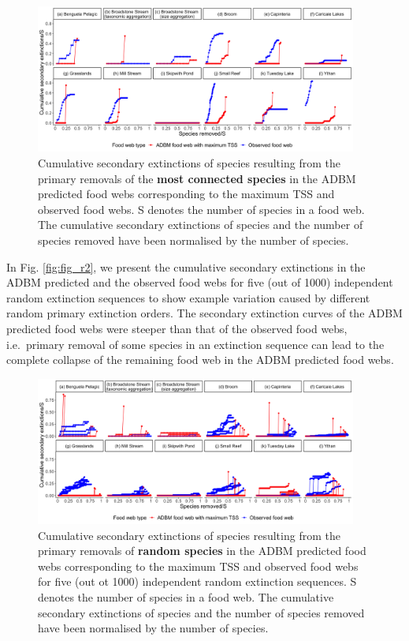\documentclass{article}
\begin{document}
\begin{figure}

{\centering \includegraphics[width=400px]{../results/plot_mostconnected_maxTSS} 

}

\caption{\label{fig:fig_r1} Cumulative secondary extinctions of species resulting from the primary removals of the \textbf{most connected species} in the ADBM predicted food webs corresponding to the maximum TSS and observed food webs. S denotes the number of species in a food web. The cumulative secondary extinctions of species and the number of species removed have been normalised by the number of species.}\label{fig:unnamed-chunk-2}
\end{figure}

In Fig. \ref{fig:fig_r2}, we present the cumulative secondary
extinctions in the ADBM predicted and the observed food webs for five
(out of 1000) independent random extinction sequences to show example
variation caused by different random primary extinction orders. The
secondary extinction curves of the ADBM predicted food webs were steeper
than that of the observed food webs, i.e.~primary removal of some
species in an extinction sequence can lead to the complete collapse of
the remaining food web in the ADBM predicted food webs.

\begin{figure}

{\centering \includegraphics[width=400px]{../results/plot_ra_extlines_maxTSS} 

}

\caption{\label{fig:fig_r2} Cumulative secondary extinctions of species resulting from the primary removals of \textbf{random species} in the ADBM predicted food webs corresponding to the maximum TSS and observed food webs for five (out ot 1000) independent random extinction sequences. S denotes the number of species in a food web. The cumulative secondary extinctions of species and the number of species removed have been normalised by the number of species.}\label{fig:unnamed-chunk-3}
\end{figure}
\end{document}
